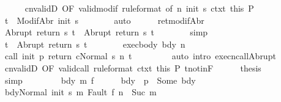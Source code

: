 \begin{isabellebody}
\ \ \ \ \isamarkupfalse%
\ cnvalidD\ {\isacharbrackleft}OF\ valid{\isacharunderscore}modif\ {\isacharbrackleft}rule{\isacharunderscore}format{\isacharcomma}\ of\ n\ {\isachardoublequoteopen}init\ s{\isachardoublequoteclose}{\isacharbrackright}\ ctxt{\isacharprime}\ this{\isacharbrackright}\ P\isanewline
\ \ \ \ \isamarkupfalse%
\ {\isachardoublequoteopen}t{\isacharprime}\ {\isasymin}\ ModifAbr\ {\isacharparenleft}init\ s{\isacharparenright}{\isachardoublequoteclose}\isanewline
\ \ \ \ \ \ \isamarkupfalse%
\ auto\isanewline
\ \ \ \ \isamarkupfalse%
\ ret{\isacharunderscore}modifAbr\ \isamarkupfalse%
\ {\isachardoublequoteopen}Abrupt\ {\isacharparenleft}return\ s\ t{\isacharprime}{\isacharparenright}\ {\isacharequal}\ Abrupt\ {\isacharparenleft}return{\isacharprime}\ s\ t{\isacharprime}{\isacharparenright}{\isachardoublequoteclose}\isanewline
\ \ \ \ \ \ \isamarkupfalse%
\ simp\isanewline
\ \ \ \ \isamarkupfalse%
\ \isamarkupfalse%
\ {\isachardoublequoteopen}t\ {\isacharequal}\ Abrupt\ {\isacharparenleft}return{\isacharprime}\ s\ t{\isacharprime}{\isacharparenright}{\isachardoublequoteclose}\ \ \isacommand{{\isachardot}}\isamarkupfalse%
\isanewline
\ \ \ \ \isamarkupfalse%
\ exec{\isacharunderscore}body\ bdy\ n\isanewline
\ \ \ \ \isamarkupfalse%
\ {\isachardoublequoteopen}{\isasymGamma}{\isasymturnstile}{\isasymlangle}call\ init\ p\ return{\isacharprime}\ c{\isacharcomma}Normal\ s{\isasymrangle}\ {\isacharequal}n{\isasymRightarrow}\ t{\isachardoublequoteclose}\ \isanewline
\ \ \ \ \ \ \isamarkupfalse%
\ {\isacharparenleft}auto\ intro{\isacharcolon}\ execn{\isacharunderscore}callAbrupt{\isacharparenright}\isanewline
\ \ \ \ \isamarkupfalse%
\ cnvalidD\ {\isacharbrackleft}OF\ valid{\isacharunderscore}call\ {\isacharbrackleft}rule{\isacharunderscore}format{\isacharbrackright}\ ctxt\ this{\isacharbrackright}\ P\ t{\isacharunderscore}notin{\isacharunderscore}F\isanewline
\ \ \ \ \isamarkupfalse%
\ {\isacharquery}thesis\isanewline
\ \ \ \ \ \ \isamarkupfalse%
\ simp\isanewline
\ \ \isamarkupfalse%
\isanewline
\ \ \ \ \isamarkupfalse%
\ bdy\ m\ f\isanewline
\ \ \ \ \isamarkupfalse%
\ bdy{\isacharcolon}\ {\isachardoublequoteopen}{\isasymGamma}\ p\ {\isacharequal}\ Some\ bdy{\isachardoublequoteclose}\isanewline
\ \ \ \ \isamarkupfalse%
\ {\isachardoublequoteopen}{\isasymGamma}{\isasymturnstile}{\isasymlangle}bdy{\isacharcomma}Normal\ {\isacharparenleft}init\ s{\isacharparenright}{\isasymrangle}\ {\isacharequal}m{\isasymRightarrow}\ Fault\ f{\isachardoublequoteclose}\ {\isachardoublequoteopen}n\ {\isacharequal}\ Suc\ m{\isachardoublequoteclose}\ \isanewline

\end{isabellebody}
